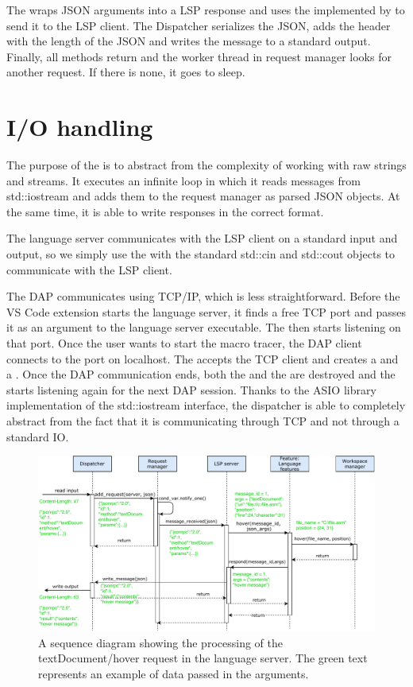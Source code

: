 The  wraps JSON arguments into a LSP response and uses the  implemented by  to send it to the LSP client. The Dispatcher serializes the JSON, adds the header with the length of the JSON and writes the message to a standard output. Finally, all methods return and the worker thread in request manager looks for another request. If there is none, it goes to sleep.

\section{I/O handling}
The purpose of the  is to abstract from the complexity of working with raw strings and streams. It executes an infinite loop in which it reads messages from std::iostream and adds them to the request manager as parsed JSON objects. At the same time, it is able to write responses in the correct format.

The language server communicates with the LSP client on a standard input and output, so we simply use the  with the standard std::cin and std::cout objects to communicate with the LSP client.

The DAP communicates using TCP/IP, which is less straightforward. Before the VS Code extension starts the language server, it finds a free TCP port and passes it as an argument to the language server executable. The  then starts listening on that port. Once the user wants to start the macro tracer, the DAP client connects to the port on localhost. The  accepts the TCP client and creates a  and a . Once the DAP communication ends, both the  and the  are destroyed and the  starts listening again for the next DAP session. Thanks to the ASIO library implementation of the std::iostream interface, the dispatcher is able to completely abstract from the fact that it is communicating through TCP and not through a standard IO.

\begin{landscape}
	\begin{figure}
		\centering
		\includegraphics[width=21cm]{img/hover_sequence}
		\caption{A sequence diagram showing the processing of the textDocument/hover request in the language server. The green text represents an example of data passed in the arguments.}
		\label{hover_sequence}
	\end{figure}
\end{landscape}


